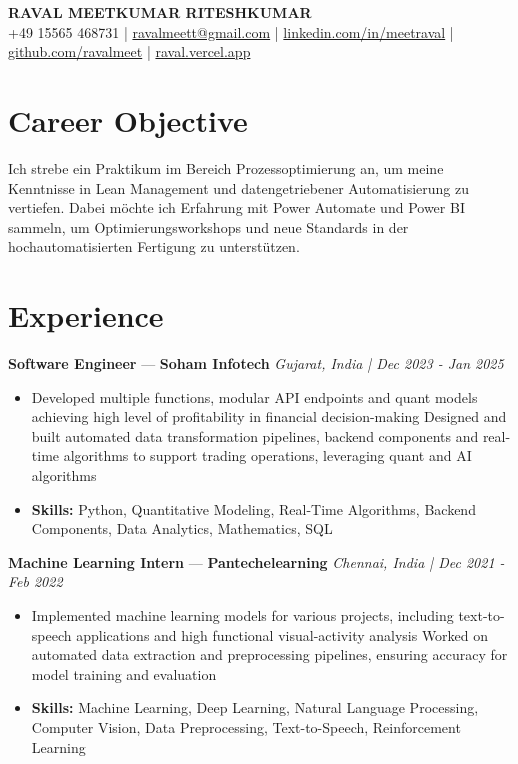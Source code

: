 \documentclass[a4paper,10pt]{article}
\begin{document}
\begin{center}
  {\Large\bfseries RAVAL MEETKUMAR RITESHKUMAR}\\[2pt]
  {\small +49 15565 468731 \;|\; \href{mailto:ravalmeett@gmail.com}{ravalmeett@gmail.com} \;|\; \href{https://www.linkedin.com/in/meetraval/}{linkedin.com/in/meetraval} \;|\; \href{https://github.com/ravalmeet}{github.com/ravalmeet} \;|\; \href{https://raval.vercel.app/}{raval.vercel.app}}
\end{center}
\vspace{-3pt}

\section*{Career Objective}
Ich strebe ein Praktikum im Bereich Prozessoptimierung an, um meine Kenntnisse in Lean Management und datengetriebener Automatisierung zu vertiefen. Dabei möchte ich Erfahrung mit Power Automate und Power BI sammeln, um Optimierungsworkshops und neue Standards in der hochautomatisierten Fertigung zu unterstützen.\par

\section*{Experience}
\textbf{Software Engineer} — \textbf{Soham Infotech} \hfill \textit{Gujarat, India \;|\; Dec 2023 - Jan 2025}\par
\vspace{1pt}
\begin{itemize}
  \item Developed multiple functions, modular API endpoints and quant models achieving high level of profitability in financial decision-making Designed and built automated data transformation pipelines, backend components and real-time algorithms to support trading operations, leveraging quant and AI algorithms
  \item \textbf{Skills:} Python, Quantitative Modeling, Real-Time Algorithms, Backend Components, Data Analytics, Mathematics, SQL
\end{itemize}
\vspace{3pt}
\textbf{Machine Learning Intern} — \textbf{Pantechelearning} \hfill \textit{Chennai, India \;|\; Dec 2021 - Feb 2022}\par
\vspace{1pt}
\begin{itemize}
  \item Implemented machine learning models for various projects, including text-to-speech applications and high functional visual-activity analysis Worked on automated data extraction and preprocessing pipelines, ensuring accuracy for model training and evaluation
  \item \textbf{Skills:} Machine Learning, Deep Learning, Natural Language Processing, Computer Vision, Data Preprocessing, Text-to-Speech, Reinforcement Learning
\end{itemize}
\end{document}
